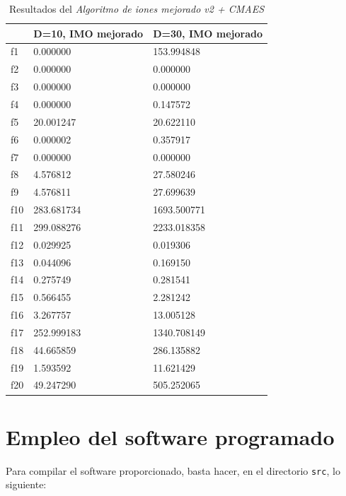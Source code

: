 \documentclass[a4paper,11pt]{article}
\begin{document}
\begin{itemize}
  \begin{table}[H]	
  \caption{Resultados del \textit{Algoritmo de iones mejorado v2 + CMAES}}
  \centering
  \begin{tabular}{|l|l|l|}
  \hline
  & \textbf{D=10, IMO mejorado} & \textbf{D=30, IMO mejorado} \\ \hline
  f1 &  0.000000 &  153.994848 \\ \hline
  f2 &  0.000000 &  0.000000 \\ \hline
  f3 &  0.000000 &  0.000000 \\ \hline
  f4 &  0.000000 &  0.147572 \\ \hline
  f5 &  20.001247 &  20.622110 \\ \hline
  f6 &  0.000002 &  0.357917 \\ \hline
  f7 &  0.000000 &  0.000000 \\ \hline
  f8 &  4.576812 &  27.580246 \\ \hline
  f9 &  4.576811 &  27.699639 \\ \hline
  f10 &  283.681734 &  1693.500771 \\ \hline
  f11 &  299.088276 &  2233.018358 \\ \hline
  f12 &  0.029925 &  0.019306 \\ \hline
  f13 &  0.044096 &  0.169150 \\ \hline
  f14 &  0.275749 &  0.281541 \\ \hline
  f15 &  0.566455 &  2.281242 \\ \hline
  f16 &  3.267757 &  13.005128 \\ \hline
  f17 &  252.999183 &  1340.708149 \\ \hline
  f18 &  44.665859 &  286.135882 \\ \hline
  f19 &  1.593592 &  11.621429 \\ \hline
  f20 &  49.247290 &  505.252065 \\ \hline
  \end{tabular}
  \end{table}
  
  
\end{itemize}



\section{Empleo del software programado}

Para compilar el software proporcionado, basta hacer, en el directorio \texttt{src}, lo siguiente:
\end{document}
